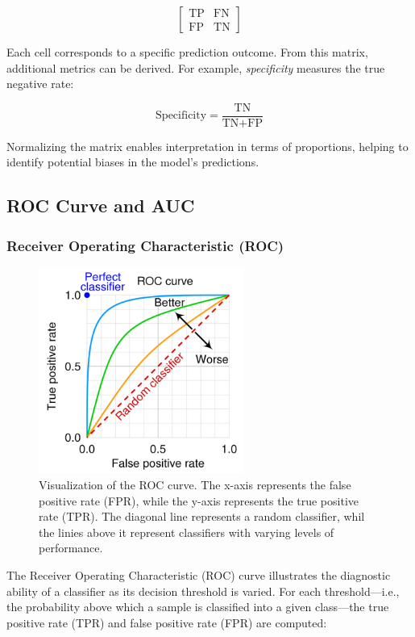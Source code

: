 \documentclass{pracalicmgr}
\begin{document}
\[
\begin{bmatrix}
\text{TP} & \text{FN} \\
\text{FP} & \text{TN}
\end{bmatrix}
\]

Each cell corresponds to a specific prediction outcome. From this matrix, additional metrics can be derived. For example, \textit{specificity} measures the true negative rate:

\[
\text{Specificity} = \frac{\text{TN}}{\text{TN} + \text{FP}}
\]

Normalizing the matrix enables interpretation in terms of proportions, helping to identify potential biases in the model's predictions.

\subsection{ROC Curve and AUC}

\subsubsection{Receiver Operating Characteristic (ROC)}

\begin{figure}[H]
    \centering
    \includegraphics[width=0.6\textwidth]{src/roc-curveUp.jpg}
    \caption{Visualization of the ROC curve. The x-axis represents the false positive rate (FPR), while the y-axis represents the true positive rate (TPR). The diagonal line represents a random classifier, whil the linies above it represent classifiers with varying levels of performance.}
    \label{fig:roc_curve}
\end{figure}

The Receiver Operating Characteristic (ROC) curve illustrates the diagnostic ability of a classifier as its decision threshold is varied. For each threshold—i.e., the probability above which a sample is classified into a given class—the true positive rate (TPR) and false positive rate (FPR) are computed:
\end{document}
